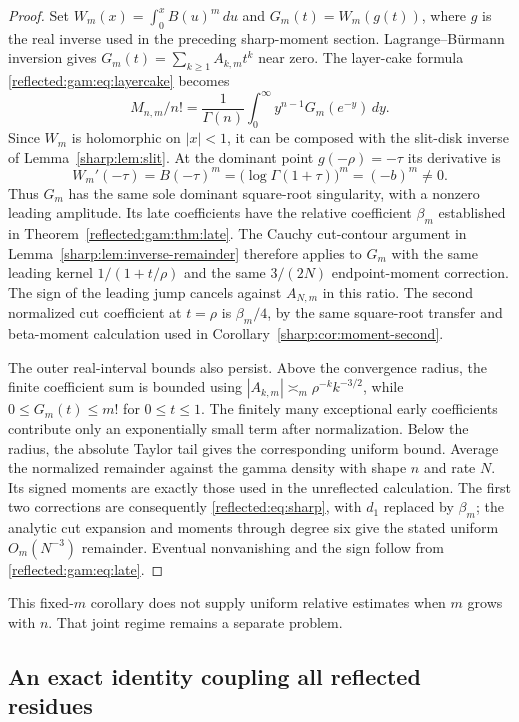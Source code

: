 \begin{proof}
Set $W_m(x)=\int_0^x B(u)^m\,du$ and $G_m(t)=W_m(g(t))$, where $g$ is
the real inverse used in the preceding sharp-moment section.
Lagrange--B\"urmann inversion gives
$G_m(t)=\sum_{k\ge1}A_{k,m}t^k$ near zero. The layer-cake formula
\eqref{reflected:gam:eq:layercake} becomes
\[
 M_{n,m}/n!=\frac1{\Gamma(n)}\int_0^\infty y^{n-1}G_m(e^{-y})\,dy.
\]
Since $W_m$ is holomorphic on $|x|<1$, it can be composed with the
slit-disk inverse of Lemma~\ref{sharp:lem:slit}. At the dominant point
$g(-\rho)=-\tau$ its derivative is
\[
 W_m'(-\tau)=B(-\tau)^m
       =\bigl(\log\Gamma(1+\tau)\bigr)^m=(-b)^m\ne0.
\]
Thus $G_m$ has the same sole dominant square-root singularity, with a
nonzero leading amplitude. Its late coefficients have the relative
coefficient $\beta_m$ established in Theorem~\ref{reflected:gam:thm:late}.
The Cauchy cut-contour argument in Lemma~\ref{sharp:lem:inverse-remainder}
therefore applies to $G_m$ with the same leading kernel
$1/(1+t/\rho)$ and the same $3/(2N)$ endpoint-moment correction.
The sign of the leading jump cancels against $A_{N,m}$ in this ratio.
The second normalized cut coefficient at $t=\rho$ is $\beta_m/4$,
by the same square-root transfer and beta-moment calculation used in
Corollary~\ref{sharp:cor:moment-second}.

The outer real-interval bounds also persist. Above the convergence
radius, the finite coefficient sum is bounded using
$|A_{k,m}|\asymp_m\rho^{-k}k^{-3/2}$, while $0\le G_m(t)\le m!$ for
$0\le t\le1$. The finitely many exceptional early coefficients contribute
only an exponentially small term after normalization. Below the radius,
the absolute Taylor tail gives the corresponding uniform bound.
Average the normalized remainder against the gamma density with shape
$n$ and rate $N$. Its signed moments are exactly those used in the
unreflected calculation. The first two corrections are consequently
\eqref{reflected:eq:sharp}, with $d_1$ replaced by $\beta_m$; the analytic
cut expansion and moments through degree six give the stated uniform
$O_m(N^{-3})$ remainder. Eventual nonvanishing and the sign follow from
\eqref{reflected:gam:eq:late}.
\end{proof}
This fixed-$m$ corollary does not supply uniform relative estimates when
$m$ grows with $n$. That joint regime remains a separate problem.

\subsection{An exact identity coupling all reflected residues}

